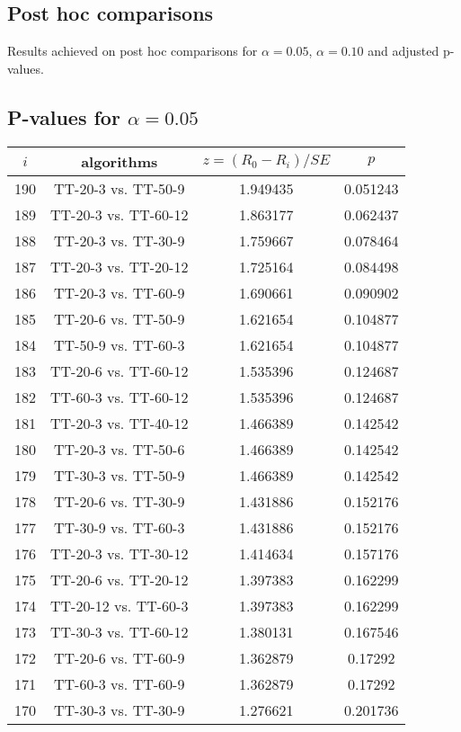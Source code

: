 \documentclass[a4paper,10pt]{article}
\begin{document}
\begin{landscape}
\section{Post hoc comparisons}

Results achieved on post hoc comparisons for $\alpha = 0.05$, $\alpha = 0.10$ and adjusted p-values.

\subsection{P-values for $\alpha=0.05$}

\begin{table}[!htp]
\centering\scriptsize
\begin{tabular}{cccc}
$i$&algorithms&$z=(R_0 - R_i)/SE$&$p$\\
\hline190&TT-20-3 vs. TT-50-9&1.949435&0.051243\\
189&TT-20-3 vs. TT-60-12&1.863177&0.062437\\
188&TT-20-3 vs. TT-30-9&1.759667&0.078464\\
187&TT-20-3 vs. TT-20-12&1.725164&0.084498\\
186&TT-20-3 vs. TT-60-9&1.690661&0.090902\\
185&TT-20-6 vs. TT-50-9&1.621654&0.104877\\
184&TT-50-9 vs. TT-60-3&1.621654&0.104877\\
183&TT-20-6 vs. TT-60-12&1.535396&0.124687\\
182&TT-60-3 vs. TT-60-12&1.535396&0.124687\\
181&TT-20-3 vs. TT-40-12&1.466389&0.142542\\
180&TT-20-3 vs. TT-50-6&1.466389&0.142542\\
179&TT-30-3 vs. TT-50-9&1.466389&0.142542\\
178&TT-20-6 vs. TT-30-9&1.431886&0.152176\\
177&TT-30-9 vs. TT-60-3&1.431886&0.152176\\
176&TT-20-3 vs. TT-30-12&1.414634&0.157176\\
175&TT-20-6 vs. TT-20-12&1.397383&0.162299\\
174&TT-20-12 vs. TT-60-3&1.397383&0.162299\\
173&TT-30-3 vs. TT-60-12&1.380131&0.167546\\
172&TT-20-6 vs. TT-60-9&1.362879&0.17292\\
171&TT-60-3 vs. TT-60-9&1.362879&0.17292\\
170&TT-30-3 vs. TT-30-9&1.276621&0.201736\\

\end{tabular}
\end{table}
\end{landscape}
\end{document}
